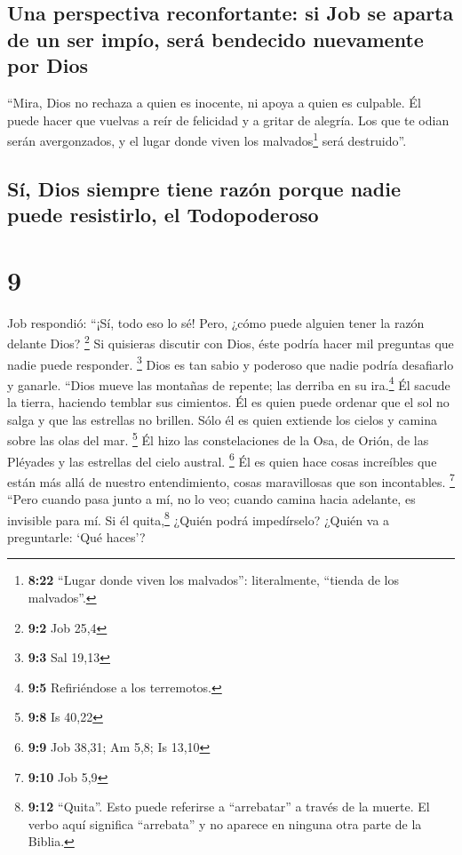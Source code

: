 \hypertarget{una-perspectiva-reconfortante-si-job-se-aparta-de-un-ser-impuxedo-seruxe1-bendecido-nuevamente-por-dios}{%
\subsection{Una perspectiva reconfortante: si Job se aparta de un ser
impío, será bendecido nuevamente por
Dios}\label{una-perspectiva-reconfortante-si-job-se-aparta-de-un-ser-impuxedo-seruxe1-bendecido-nuevamente-por-dios}}

 ``Mira, Dios no rechaza a quien es inocente, ni apoya a
quien es culpable.  Él puede hacer que vuelvas a reír de
felicidad y a gritar de alegría.  Los que te odian serán
avergonzados, y el lugar donde viven los malvados\footnote{\textbf{8:22}
  ``Lugar donde viven los malvados'': literalmente, ``tienda de los
  malvados''.} será destruido''.

\hypertarget{suxed-dios-siempre-tiene-razuxf3n-porque-nadie-puede-resistirlo-el-todopoderoso}{%
\subsection{Sí, Dios siempre tiene razón porque nadie puede resistirlo,
el
Todopoderoso}\label{suxed-dios-siempre-tiene-razuxf3n-porque-nadie-puede-resistirlo-el-todopoderoso}}

\hypertarget{section-8}{%
\section{9}\label{section-8}}

 Job respondió:  ``¡Sí, todo eso lo sé!
Pero, ¿cómo puede alguien tener la razón delante Dios? \footnote{\textbf{9:2}
  Job 25,4}  Si quisieras discutir con Dios, éste podría
hacer mil preguntas que nadie puede responder. \footnote{\textbf{9:3}
  Sal 19,13}  Dios es tan sabio y poderoso que nadie
podría desafiarlo y ganarle.  ``Dios mueve las montañas de
repente; las derriba en su ira.\footnote{\textbf{9:5} Refiriéndose a los
  terremotos.}  Él sacude la tierra, haciendo temblar sus
cimientos.  Él es quien puede ordenar que el sol no salga
y que las estrellas no brillen.  Sólo él es quien extiende
los cielos y camina sobre las olas del mar. \footnote{\textbf{9:8} Is
  40,22}  Él hizo las constelaciones de la Osa, de Orión,
de las Pléyades y las estrellas del cielo austral. \footnote{\textbf{9:9}
  Job 38,31; Am 5,8; Is 13,10}  Él es quien hace cosas
increíbles que están más allá de nuestro entendimiento, cosas
maravillosas que son incontables. \footnote{\textbf{9:10} Job 5,9}
 ``Pero cuando pasa junto a mí, no lo veo; cuando camina
hacia adelante, es invisible para mí.  Si él
quita,\footnote{\textbf{9:12} ``Quita''. Esto puede referirse a
  ``arrebatar'' a través de la muerte. El verbo aquí significa
  ``arrebata'' y no aparece en ninguna otra parte de la Biblia.} ¿Quién
podrá impedírselo? ¿Quién va a preguntarle: `Qué haces'?

